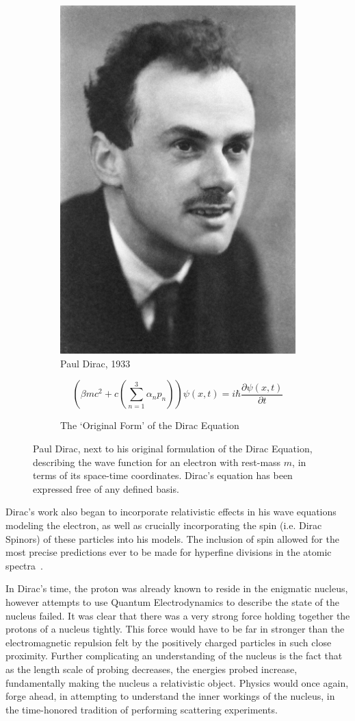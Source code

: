 \begin{figure}[ht]
	\centering
	\begin{subfigure}{.4\textwidth}
		\centering
		\includegraphics[width=0.4\linewidth]{./figures/pauldirac.jpg}
		\caption{Paul Dirac, 1933  \cite{NobelFoundation1933}}
		\label{fig:pauldirac}
	\end{subfigure}%
	\begin{subfigure}{0.6\textwidth}
		\centering
		\begin{equation}
			\left(\beta mc^2 + c\left(\sum_{n \mathop =1}^{3}\alpha_n p_n\right)\right) \psi (x,t) = i \hbar \frac{\partial\psi(x,t) }{\partial t}
		\end{equation}
		\caption{The `Original Form' of the Dirac Equation}
		\label{eq:diracquation}
	\end{subfigure}
	\caption{ 
		Paul Dirac, next to his original formulation of the Dirac Equation,
		describing the wave function for an electron with rest-mass $m$, in terms of
		its space-time coordinates. Dirac's equation has been expressed free of any
    defined basis.
	}
	\label{fig:thomsonrays}
\end{figure}

Dirac's work also began to incorporate relativistic effects in his wave
equations modeling the electron, as well as crucially incorporating the spin
(i.e. Dirac Spinors) of these particles into his models. The inclusion of spin
allowed for the most precise predictions ever to be made for hyperfine divisions
in the atomic spectra~\cite{Dirac}.

In Dirac's time, the proton was already known to reside in the enigmatic
nucleus, however attempts to use Quantum Electrodynamics to describe the state
of the nucleus failed. It was clear that there was a very strong force holding
together the protons of a nucleus tightly. This force would have to be far in
stronger than the electromagnetic repulsion felt by the positively charged
particles in such close proximity. Further complicating an understanding of the
nucleus is the fact that as the length scale of probing decreases, the energies
probed increase, fundamentally making the nucleus a relativistic object. Physics
would once again, forge ahead, in attempting to understand the inner workings of
the nucleus, in the time-honored tradition of performing scattering experiments.

